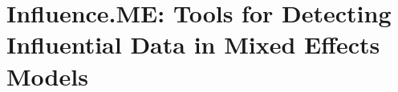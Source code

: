 \documentclass[Main.tex]{subfiles}
\begin{document}
	
	\section*{Influence.ME: Tools for Detecting Influential Data in Mixed Effects Models}
	
	

\end{document}
